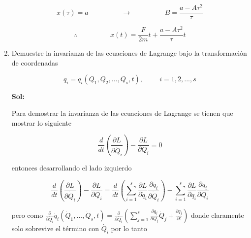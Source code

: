 \documentclass[12pt,a4paper]{article}
\begin{document}
\begin{enumerate}
    \begin{equation*}
        x(\tau) = a \hspace{2cm} \rightarrow \hspace{2cm} B= \frac{a - A \tau^2}{\tau}
    \end{equation*}
    
    \begin{equation*}
        \therefore \hspace{2cm}x(t) = \frac{F}{2m} t + \frac{a - A \tau^2}{\tau} t
    \end{equation*}
    
    
    
    
    
    
    \item Demuestre la invarianza de las ecuaciones de Lagrange bajo la transformación de coordenadas
    
    \begin{equation*}
        q_i = q_i (Q_1, Q_2, ..., Q_s, t), \hspace{1cm} i = 1,2,...,s
    \end{equation*}
    
    \textbf{Sol:}
    
    Para demostrar la invarianza de las ecuaciones de Lagrange se tienen que mostrar lo siguiente
    
    \begin{equation*}
        \frac{d}{dt} \left(\frac{\partial L}{\partial \dot{Q}_i}\right) - \frac{\partial L}{\partial Q_i} =0
    \end{equation*}
    
    entonces desarrollando el lado izquierdo
    
    \begin{equation*}
        \frac{d}{dt} \left(\frac{\partial L}{\partial \dot{Q}_i}\right) - \frac{\partial L}{\partial Q_i} = \frac{d}{dt} \left(\sum_{i=1}^{s}\frac{\partial L}{\partial \dot{q}_i} \frac{\partial \dot{q}_i}{\partial \dot{Q}_i} \right) - \sum_{i=1}^{s} \frac{\partial L}{\partial q_i} \frac{\partial q_i}{\partial Q_i} 
    \end{equation*}
    
    pero como $\frac{\partial }{\partial \dot{Q}_i} \dot{q}_i (\dot{Q}_1, ...,\dot{Q}_s, t) = \frac{\partial}{\partial \dot{Q}_i} \left(\sum_{j=1}^{s}\frac{\partial q_j}{\partial Q_j} \dot{Q}_j + \frac{\partial q_j}{\partial t}\right)$ donde claramente solo sobrevive el término con $\dot{Q_i}$ por lo tanto
    

\end{enumerate}
\end{document}
